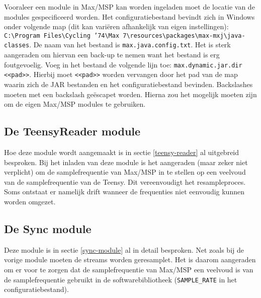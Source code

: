 Vooraleer een module in Max/MSP kan worden ingeladen moet de locatie van de modules gespecificeerd worden. Het configuratiebestand bevindt zich in Windows onder volgende map (dit kan variëren afhankelijk van eigen instellingen): \texttt{C:\textbackslash Program Files\textbackslash Cycling '74\textbackslash Max 7\textbackslash resources\textbackslash packages\textbackslash max-mxj\textbackslash java-classes}. De naam van het bestand is \texttt{max.java.config.txt}. Het is sterk aangeraden om hiervan een back-up te nemen want het bestand is erg foutgevoelig. Voeg in het bestand de volgende lijn toe: \texttt{max.dynamic.jar.dir <<pad>>}. Hierbij moet \texttt{<<pad>>} worden vervangen door het pad van de map waarin zich de JAR bestanden en het configuratiebestand bevinden. Backslashes moeten met een backslash geëscapet worden. Hierna zou het mogelijk moeten zijn om de eigen Max/MSP modules te gebruiken.

\subsection*{De TeensyReader module}
Hoe deze module wordt aangemaakt is in sectie \ref{teensy-reader} al uitgebreid besproken. Bij het inladen van deze module is het aangeraden (maar zeker niet verplicht) om de samplefrequentie van Max/MSP in te stellen op een veelvoud van de samplefrequentie van de Teensy. Dit vereenvoudigt het resampleproces. Soms ontstaat er namelijk drift wanneer de frequenties niet eenvoudig kunnen worden omgezet.


\subsection*{De Sync module}

Deze module is in sectie \ref{sync-module} al in detail besproken. Net zoals bij de vorige module moeten de streams worden geresamplet. Het is daarom aangeraden om er voor te zorgen dat de samplefrequentie van Max/MSP een veelvoud is van de samplefrequentie gebruikt in de softwarebibliotheek (\texttt{SAMPLE\_RATE} in het configuratiebestand).